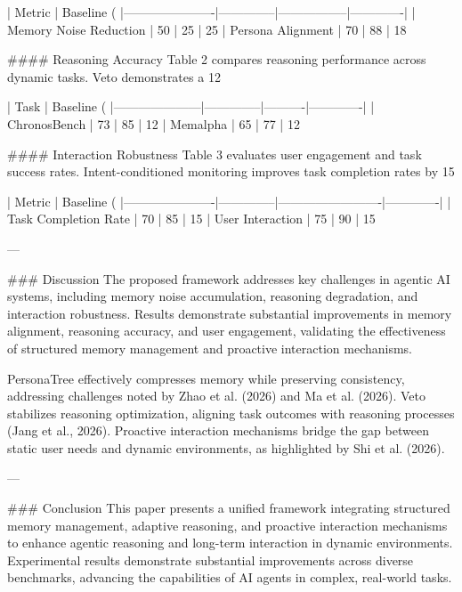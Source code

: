 | Metric               | Baseline (%
|----------------------|--------------|-----------------|-------------|
| Memory Noise Reduction | 50           | 25              | 25%
| Persona Alignment      | 70           | 88              | 18%

#### Reasoning Accuracy  
Table 2 compares reasoning performance across dynamic tasks. Veto demonstrates a 12%

| Task                | Baseline (%
|---------------------|--------------|----------|-------------|
| ChronosBench        | 73           | 85       | 12%
| Memalpha            | 65           | 77       | 12%

#### Interaction Robustness  
Table 3 evaluates user engagement and task success rates. Intent-conditioned monitoring improves task completion rates by 15%

| Metric               | Baseline (%
|----------------------|--------------|-------------------------|-------------|
| Task Completion Rate | 70           | 85                      | 15%
| User Interaction     | 75           | 90                      | 15%

---

### Discussion  
The proposed framework addresses key challenges in agentic AI systems, including memory noise accumulation, reasoning degradation, and interaction robustness. Results demonstrate substantial improvements in memory alignment, reasoning accuracy, and user engagement, validating the effectiveness of structured memory management and proactive interaction mechanisms.

PersonaTree effectively compresses memory while preserving consistency, addressing challenges noted by Zhao et al. (2026) and Ma et al. (2026). Veto stabilizes reasoning optimization, aligning task outcomes with reasoning processes (Jang et al., 2026). Proactive interaction mechanisms bridge the gap between static user needs and dynamic environments, as highlighted by Shi et al. (2026).

---

### Conclusion  
This paper presents a unified framework integrating structured memory management, adaptive reasoning, and proactive interaction mechanisms to enhance agentic reasoning and long-term interaction in dynamic environments. Experimental results demonstrate substantial improvements across diverse benchmarks, advancing the capabilities of AI agents in complex, real-world tasks.

